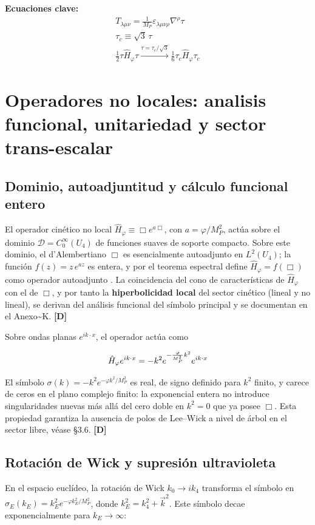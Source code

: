 ﻿\documentclass[11pt,letterpaper]{article}
\begin{document}
\textbf{Ecuaciones clave:}
\begin{align*}
    T_{\lambda\mu\nu} = \frac{1}{M_P}\varepsilon_{\lambda\mu\nu\rho}\nabla^{\rho}\tau \\
    \tau_c \equiv \sqrt{3}\,\tau \\
    \frac{1}{2}\tau\hat{H}_\varphi\tau \xrightarrow{\tau=\tau_c/\sqrt{3}} \frac{1}{6}\tau_c\hat{H}_\varphi\tau_c
\end{align*}
\section{Operadores no locales: analisis funcional, unitariedad y sector trans-escalar}
\subsection{Dominio, autoadjuntitud y cálculo funcional entero}
El operador cinético no local $\hat{H}_\varphi \equiv \Box e^{a\Box}$, con $a = \varphi/M_P^2$, actúa sobre el dominio $\mathcal{D} = C_0^\infty(U_4)$ de funciones suaves de soporte compacto. Sobre este dominio, el d'Alembertiano $\Box$ es esencialmente autoadjunto en $L^2(U_4)$; la función $f(z) = z\,e^{az}$ es entera, y por el teorema espectral define $\hat{H}_\varphi = f(\Box)$ como operador autoadjunto \cite{BasIBeneito2022}. La coincidencia del cono de características de $\hat{H}_\varphi$ con el de $\Box$, y por tanto la \textbf{hiperbolicidad local} del sector cinético (lineal y no lineal), se derivan del análisis funcional del símbolo principal y se documentan en el Anexo\textasciitilde{}K. \textbf{[D]}

Sobre ondas planas $e^{ik\cdot x}$, el operador actúa como

\begin{equation*}
  \resizebox{\ifdim\width>\linewidth \linewidth\else\width\fi}{!}{$\displaystyle \hat{H}_\varphi e^{ik\cdot x} = -k^2 e^{-\frac{\varphi}{M_P^2}k^2}e^{ik\cdot x}$}
\end{equation*}

El símbolo $\sigma(k) = -k^2 e^{-\varphi k^2/M_P^2}$ es real, de signo definido para $k^2$ finito, y carece de ceros en el plano complejo finito: la exponencial entera no introduce singularidades nuevas más allá del cero doble en $k^2 = 0$ que ya posee $\Box$. Esta propiedad garantiza la ausencia de polos de Lee--Wick a nivel de árbol en el sector libre, véase §3.6. \textbf{[D]}
\subsection{Rotación de Wick y supresión ultravioleta}
En el espacio euclídeo, la rotación de Wick $k_0 \to i k_4$ transforma el símbolo en $\sigma_E(k_E) = k_E^2 e^{-\varphi k_E^2/M_P^2}$, donde $k_E^2 = k_4^2 + \vec{k}^2$. Este símbolo decae exponencialmente para $k_E \to \infty$:
\end{document}
